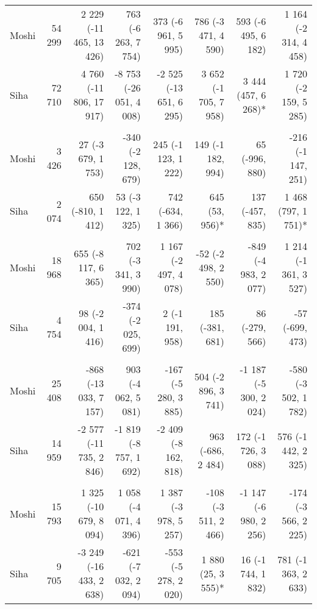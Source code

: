 \begin{table}[t]
\begin{tabular*}{\linewidth}{@{\extracolsep{\fill}}l|rrrrrrr}
\midrule\addlinespace[2.5pt]
\multicolumn{8}{l}{Intestinal Worms} \\[2.5pt] 
\midrule\addlinespace[2.5pt]
Moshi & 54 299 & 2 229 (-11 465, 13 426)  & 763 (-6 263, 7 754)  & 373 (-6 961, 5 995)  & 786 (-3 471, 4 590)  & 593 (-6 495, 6 182)  & 1 164 (-2 314, 4 458)  \\ 
Siha & 72 710 & 4 760 (-11 806, 17 917)  & -8 753 (-26 051, 4 008)  & -2 525 (-13 651, 6 295)  & 3 652 (-1 705, 7 958)  & 3 444 (457, 6 268)* & 1 720 (-2 159, 5 285)  \\ 
\midrule\addlinespace[2.5pt]
\multicolumn{8}{l}{Neoplasms/Cancer} \\[2.5pt] 
\midrule\addlinespace[2.5pt]
Moshi & 3 426 & 27 (-3 679, 1 753)  & -340 (-2 128, 679)  & 245 (-1 123, 1 222)  & 149 (-1 182, 994)  & 65 (-996, 880)  & -216 (-1 147, 251)  \\ 
Siha & 2 074 & 650 (-810, 1 412)  & 53 (-3 122, 1 325)  & 742 (-634, 1 366)  & 645 (53, 956)* & 137 (-457, 835)  & 1 468 (797, 1 751)* \\ 
\midrule\addlinespace[2.5pt]
\multicolumn{8}{l}{Other Cardiovascular Diseases} \\[2.5pt] 
\midrule\addlinespace[2.5pt]
Moshi & 18 968 & 655 (-8 117, 6 365)  & 702 (-3 341, 3 990)  & 1 167 (-2 497, 4 078)  & -52 (-2 498, 2 550)  & -849 (-4 983, 2 077)  & 1 214 (-1 361, 3 527)  \\ 
Siha & 4 754 & 98 (-2 004, 1 416)  & -374 (-2 025, 699)  & 2 (-1 191, 958)  & 185 (-381, 681)  & 86 (-279, 566)  & -57 (-699, 473)  \\ 
\midrule\addlinespace[2.5pt]
\multicolumn{8}{l}{Mild/Moderate Anemia} \\[2.5pt] 
\midrule\addlinespace[2.5pt]
Moshi & 25 408 & -868 (-13 033, 7 157)  & 903 (-4 062, 5 081)  & -167 (-5 280, 3 885)  & 504 (-2 896, 3 741)  & -1 187 (-5 300, 2 024)  & -580 (-3 502, 1 782)  \\ 
Siha & 14 959 & -2 577 (-11 735, 2 846)  & -1 819 (-8 757, 1 692)  & -2 409 (-8 162, 818)  & 963 (-686, 2 484)  & 172 (-1 726, 3 088)  & 576 (-1 442, 2 325)  \\ 
\midrule\addlinespace[2.5pt]
\multicolumn{8}{l}{Caries} \\[2.5pt] 
\midrule\addlinespace[2.5pt]
Moshi & 15 793 & 1 325 (-10 679, 8 094)  & 1 058 (-4 071, 4 396)  & 1 387 (-3 978, 5 257)  & -108 (-3 511, 2 466)  & -1 147 (-6 980, 2 256)  & -174 (-3 566, 2 225)  \\ 
Siha & 9 705 & -3 249 (-16 433, 2 638)  & -621 (-7 032, 2 094)  & -553 (-5 278, 2 020)  & 1 880 (25, 3 555)* & 16 (-1 744, 1 832)  & 781 (-1 363, 2 633)  \\ 

\end{tabular*}
\end{table}
